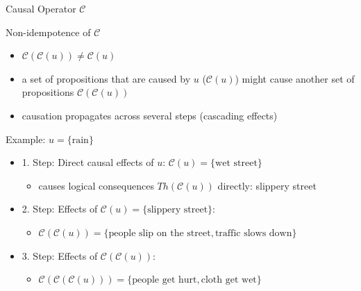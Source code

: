 \documentclass{beamer} %
\begin{document}
\begin{frame}[allowframebreaks]{Causal Operator $\mathcal{C}$ }
    \begin{block}{Non-idempotence of $\mathcal{C}$}
        \begin{itemize}
            \item $\mathcal{C}(\mathcal{C}(u)) \neq \mathcal{C}(u)$    
            \item a set of propositions that are caused by $u$ ($\mathcal{C}(u)$) might cause another set of propositions $\mathcal{C}(\mathcal{C}(u))$
            \item causation propagates across several steps (cascading effects)
        \end{itemize}
    \end{block}
    \begin{exampleblock}{Example: $u = \{\text{rain}\}$}
        \begin{itemize}
            \item 1. Step: Direct causal effects of $u$: $\mathcal{C}(u)=\{\text{wet street}\}$
            \begin{itemize}
                \item causes logical consequences $Th(\mathcal{C}(u))$ directly: slippery street
            \end{itemize}
            \item 2. Step: Effects of $\mathcal{C}(u)=\{\text{slippery street}\}$: 
            \begin{itemize}
                \item $\mathcal{C}(\mathcal{C}(u)) = \{\text{people slip on the street}, \text{traffic slows down}\}$
            \end{itemize}
            \item 3. Step: Effects of $\mathcal{C}(\mathcal{C}(u))$: 
            \begin{itemize}
                \item $\mathcal{C}(\mathcal{C}(\mathcal{C}(u))) = \{\text{people get hurt}, \text{cloth get wet}\}$
            \end{itemize}
        \end{itemize}
    \end{exampleblock}

\end{frame}
\end{document}
